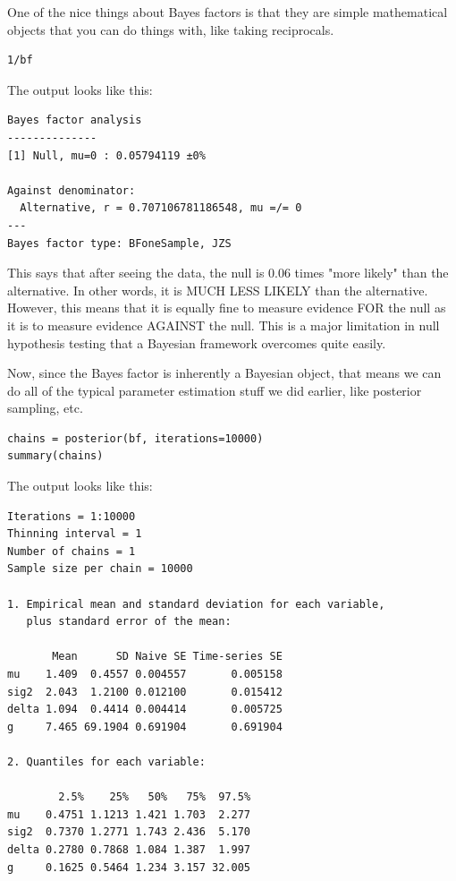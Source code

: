 \documentclass[11pt]{article}
\begin{document}
One of the nice things about Bayes factors is that they are simple mathematical objects that you can do things with, like taking reciprocals.

\begin{verbatim}
1/bf
\end{verbatim}

The output looks like this:

\begin{verbatim}
Bayes factor analysis
--------------
[1] Null, mu=0 : 0.05794119 ±0%

Against denominator:
  Alternative, r = 0.707106781186548, mu =/= 0 
---
Bayes factor type: BFoneSample, JZS
\end{verbatim}

This says that after seeing the data, the null is 0.06 times "more likely" than the alternative.  In other words, it is MUCH LESS LIKELY than the alternative.  However, this means that it is equally fine to measure evidence FOR the null as it is to measure evidence AGAINST the null.  This is a major limitation in null hypothesis testing that a Bayesian framework overcomes quite easily.

Now, since the Bayes factor is inherently a Bayesian object, that means we can do all of the typical parameter estimation stuff we did earlier, like posterior sampling, etc.

\begin{verbatim}
chains = posterior(bf, iterations=10000)
summary(chains)
\end{verbatim}

The output looks like this:

\begin{verbatim}
Iterations = 1:10000
Thinning interval = 1 
Number of chains = 1 
Sample size per chain = 10000 

1. Empirical mean and standard deviation for each variable,
   plus standard error of the mean:

       Mean      SD Naive SE Time-series SE
mu    1.409  0.4557 0.004557       0.005158
sig2  2.043  1.2100 0.012100       0.015412
delta 1.094  0.4414 0.004414       0.005725
g     7.465 69.1904 0.691904       0.691904

2. Quantiles for each variable:

        2.5%    25%   50%   75%  97.5%
mu    0.4751 1.1213 1.421 1.703  2.277
sig2  0.7370 1.2771 1.743 2.436  5.170
delta 0.2780 0.7868 1.084 1.387  1.997
g     0.1625 0.5464 1.234 3.157 32.005
\end{verbatim}
\end{document}
